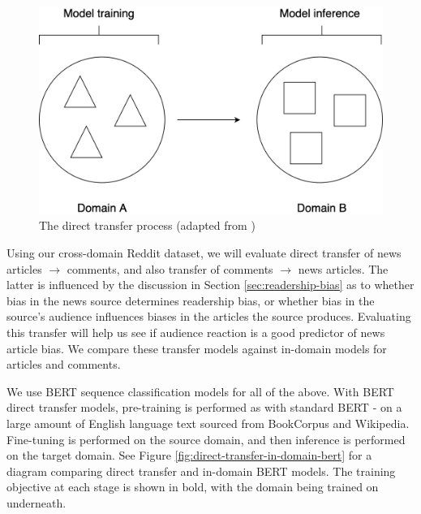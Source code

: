 \begin{figure}[ht]
    \centering
    \includegraphics[scale=0.25]{0-img/direct-transfer.png}
    \caption{The direct transfer process (adapted from \cite{ruder})}
    \label{fig:direct-transfer}
\end{figure}

Using our cross-domain Reddit dataset, we will evaluate direct transfer of news articles $ \rightarrow $ comments, and also transfer of comments $ \rightarrow $ news articles. The latter is influenced by the discussion in Section \ref{sec:readership-bias} as to whether bias in the news source determines readership bias, or whether bias in the source's audience influences biases in the articles the source produces. Evaluating this transfer will help us see if audience reaction is a good predictor of news article bias. We compare these transfer models against in-domain models for articles and comments.

We use BERT sequence classification models for all of the above. With BERT direct transfer models, pre-training is performed as with standard BERT - on a large amount of English language text sourced from BookCorpus and Wikipedia. Fine-tuning is performed on the source domain, and then inference is performed on the target domain. See Figure \ref{fig:direct-transfer-in-domain-bert} for a diagram comparing direct transfer and in-domain BERT models. The training objective at each stage is shown in bold, with the domain being trained on underneath.

